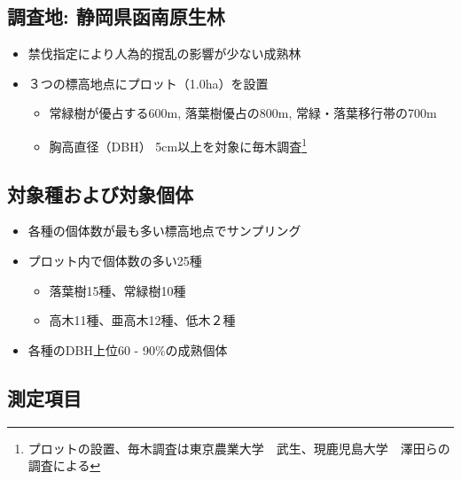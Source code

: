 \documentclass[a0, 36pt, plainboxedsections]{sciposter} %
\begin{document}
\begin{multicols}{3}\footnotesize{

\subsection*{\small{調査地: 静岡県函南原生林}}

\begin{itemize}\setlength{\itemindent}{1em}
  \item 禁伐指定により人為的撹乱の影響が少ない成熟林
  \item ３つの標高地点にプロット（1.0ha）を設置
  \begin{itemize}\setlength{\itemindent}{1em}
    \item 常緑樹が優占する600m, 落葉樹優占の800m, \newline 常緑・落葉移行帯の700m
    \item 胸高直径（DBH） 5cm以上を対象に毎木調査\footnote{プロットの設置、毎木調査は東京農業大学　武生、現鹿児島大学　澤田らの調査による}
  \end{itemize}
\end{itemize}


\subsection*{\small{対象種および対象個体}}

\begin{itemize}\setlength{\itemindent}{1em}
  \item 各種の個体数が最も多い標高地点でサンプリング
  \item プロット内で個体数の多い25種
  \begin{itemize}\setlength{\itemindent}{1em}
    \item 落葉樹15種、常緑樹10種
    \item 高木11種、亜高木12種、低木２種
  \end{itemize}
  \item 各種のDBH上位60 - 90\%の成熟個体
\end{itemize}

\columnbreak
\subsection*{\small{測定項目}}

}
\end{multicols}
\end{document}
